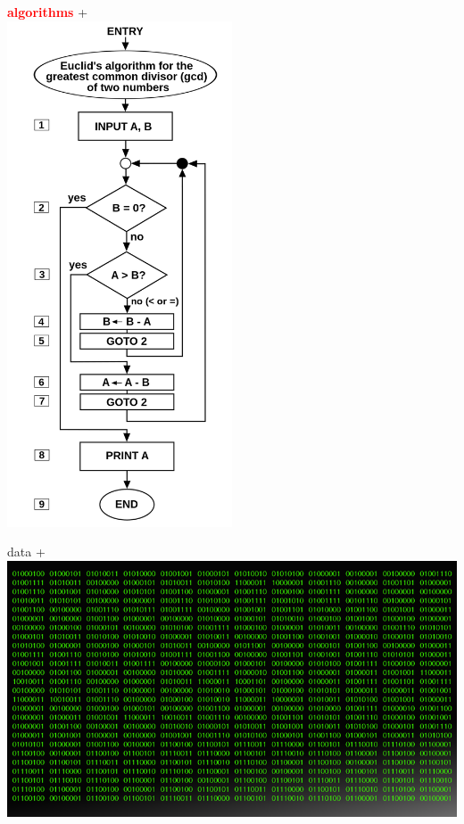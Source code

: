\documentclass[12pt]{beamer}
\begin{document}
\begin{frame}[allowframebreaks]
\begin{minipage}[t]{0.2\textwidth}
\centering
\textbf{\textcolor{red}{algorithms}} + 
\\
\includegraphics[width=0.5\textwidth]{Figures/algorithm.png} 
\end{minipage} 
\begin{minipage}[t]{0.2\textwidth}
\centering
data + 
\\\vskip 0.2cm
\includegraphics[width=\textwidth]{Figures/data.png} 
\end{minipage} 
\begin{minipage}[t]{0.2\textwidth}

\end{minipage}
\end{frame}
\end{document}
